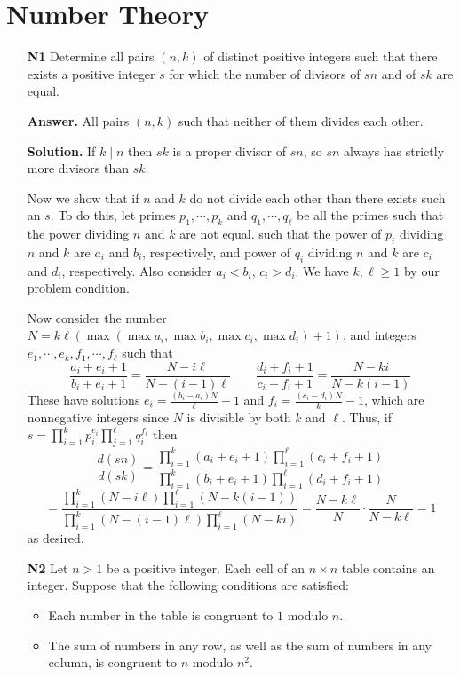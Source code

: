 \documentclass[11pt,a4paper]{article}
\begin{document}
\section*{Number Theory}
\begin{enumerate}
	\item[\textbf{N1}] Determine all pairs $(n, k)$ of distinct positive integers such that there exists a positive integer $s$ for which the number of divisors of $sn$ and of $sk$ are equal.
	
	\textbf{Answer.} All pairs $(n, k)$ such that neither of them divides each other. 
	
	\textbf{Solution.} If $k\mid n$ then $sk$ is a proper divisor of $sn$, so $sn$ always has strictly more divisors than $sk$. 
	
	Now we show that if $n$ and $k$ do not divide each other than there exists such an $s$. 
	To do this, let primes $p_1, \cdots, p_k$ and $q_1, \cdots, q_{\ell}$ be all the primes such that the power dividing $n$ and $k$ are not equal. 
	such that the power of $p_i$ dividing $n$ and $k$ are $a_i$ and $b_i$, 
	respectively, and power of $q_i$ dividing $n$ and $k$ are $c_i$ and $d_i$, 
	respectively. 
	Also consider $a_i<b_i$, $c_i>d_i$. We have $k, \ell\ge 1$ by our problem condition. 
	
	Now consider the number $N=k\ell(\max(\max a_i, \max b_i, \max c_i, \max d_i) + 1)$, 
	and integers $e_1, \cdots, e_k, f_1, \cdots, f_{\ell}$ such that 
	\[
	\frac{a_i+e_i+1}{b_i+e_i+1} = \frac{N - i\ell}{N - (i-1)\ell}
	\qquad 
	\frac{d_i+f_i+1}{c_i+f_i+1} = \frac{N - ki}{N - k(i-1)}
	\]
	These have solutions $e_i=\frac{(b_i-a_i)N}{\ell}-1$ and $f_i = \frac{(c_i-d_i)N}{k}-1$, 
	which are nonnegative integers since $N$ is divisible by both $k$ and $\ell$. 
	Thus, if $s = \prod_{i=1}^{k} p_i^{e_i}\prod_{j=1}^{\ell}q_i^{f_{\ell}}$ then 
	\[
	\frac{d(sn)}{d(sk)} = \frac{\prod_{i=1}^k (a_i + e_i + 1)\prod_{i=1}^{\ell} (c_i + f_i + 1)}
	{\prod_{i=1}^k (b_i + e_i + 1)\prod_{i=1}^{\ell} (d_i + f_i + 1)}
	\]\[
	= \frac{\prod_{i=1}^k (N-i\ell)\prod_{i=1}^{\ell} (N - k(i-1))}
	{\prod_{i=1}^k (N - (i-1)\ell)\prod_{i=1}^{\ell} (N - ki)}
	=\frac{N-k\ell}{N}\cdot \frac{N}{N-k\ell}
	=1
	\]
	as desired. 
	
	\item[\textbf{N2}] Let $n>1$ be a positive integer. Each cell of an $n\times n$ table contains an integer. Suppose that the following conditions are satisfied:
	\begin{itemize}
		\item Each number in the table is congruent to $1$ modulo $n$.
		\item The sum of numbers in any row, as well as the sum of numbers in any column, is congruent to $n$ modulo $n^2$.
	\end{itemize}
	

\end{enumerate}
\end{document}
